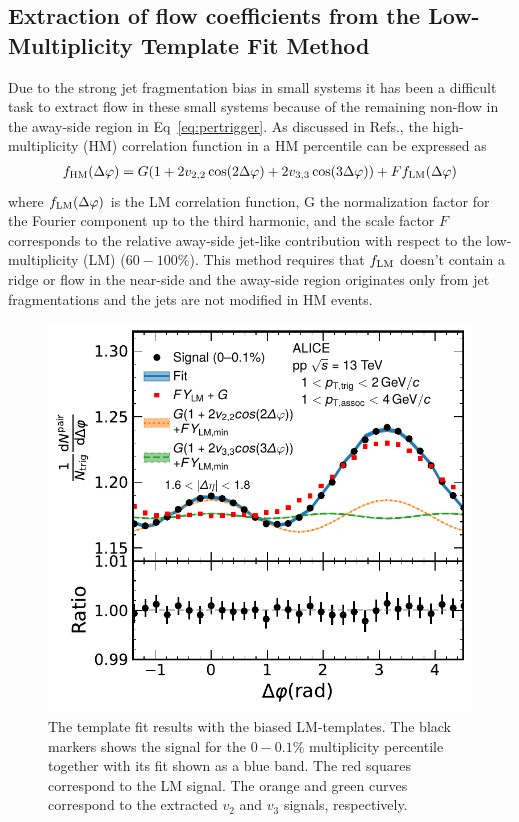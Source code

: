 \subsection{Extraction of flow coefficients from the Low-Multiplicity Template Fit Method}

Due to the strong jet fragmentation bias in small systems it has been a difficult task to extract flow in these small systems because of the remaining non-flow in the away-side region in Eq~\ref{eq:pertrigger}. As discussed in Refs.\cite{ATLAS:2015hzw,ATLAS:2016yzd}, the high-multiplicity (HM) correlation function in a HM percentile can be expressed as 
\begin{eqnarray}
f_{\rm{HM}}(\Delta\varphi) = G(1 + 2v_{2,2}\cos(2\Delta\varphi) + 2v_{3,3}\cos(3\Delta\varphi)) + Ff_{\rm{LM}}(\Delta\varphi)
\end{eqnarray}
where $f_{\rm{LM}}(\Delta\varphi)$ is the LM correlation function, G the normalization factor for the Fourier component up to the third harmonic, and the scale factor $F$ corresponds to the relative away-side jet-like contribution with respect to the low-multiplicity (LM) ($60-100\%$). This method requires that $f_{\rm{LM}}$ doesn't contain a ridge or flow in the near-side and the away-side region originates only from jet fragmentations and the jets are not modified in HM events. 

\begin{figure}[h!]
	\centering
	\includegraphics[width=0.6 \textwidth]{figures/Fig1_FlowExt.pdf} 
	\caption{The template fit results with the biased LM-templates. The black markers shows the signal for the $0-0.1\%$ multiplicity percentile together with its fit shown as a blue band. The red squares correspond to the LM signal. The orange and green curves correspond to the extracted $v_2$ and $v_3$ signals, respectively.}
	\label{fig:flowext}
\end{figure}

